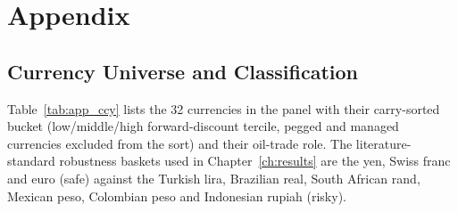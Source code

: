 
\chapter{Appendix}
\label{ch:appendix_a}

\section{Currency Universe and Classification}
\label{sec:app_classification}

Table~\ref{tab:app_ccy} lists the 32 currencies in the panel with their carry-sorted bucket
(low/middle/high forward-discount tercile, pegged and managed currencies excluded from the
sort) and their oil-trade role. The literature-standard robustness baskets used in
Chapter~\ref{ch:results} are the yen, Swiss franc and euro (safe) against the Turkish
lira, Brazilian real, South African rand, Mexican peso, Colombian peso and Indonesian rupiah
(risky).


